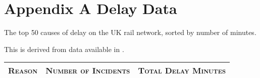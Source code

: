 
\chapter{Appendix A Delay Data}
\label{appendix:delaydata}
The top 50 causes of delay on the UK rail network, sorted by number of minutes.

This is derived from data available in \citep{NetworkRailInfrastructureLtd2017}.


\begin{landscape}

\begin{longtabu} to \linewidth {|X[1 , p ] |X[0.4 , c ] | X[0.4 , c ]}\firsthline\hline
\textsc{Reason}  &\textsc{Number of Incidents} & \textsc{Total Delay Minutes} \\ \hline
%
\endhead



\end{longtabu}
\end{landscape}
